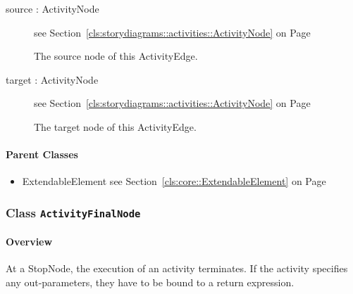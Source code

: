 \begin{description}
\begin{description}
	
\item[source : ActivityNode 	]
see Section~\ref{cls:storydiagrams::activities::ActivityNode} on Page~\pageref{cls:storydiagrams::activities::ActivityNode}
\hspace{\fill}
\nopagebreak


	
			
The source node of this ActivityEdge.	
		
	
\item[target : ActivityNode 	]
see Section~\ref{cls:storydiagrams::activities::ActivityNode} on Page~\pageref{cls:storydiagrams::activities::ActivityNode}
\hspace{\fill}
\nopagebreak


	
			
The target node of this ActivityEdge.	
		
	
	\end{description}
	

\end{description}

\paragraph{Parent Classes}
\begin{itemize}
\item ExtendableElement see Section~\ref{cls:core::ExtendableElement} on Page~\pageref{cls:core::ExtendableElement}\end{itemize}
\subsubsection{\Large{Class \bfseries \texttt{ActivityFinalNode}\normalfont}}
\label{cls:storydiagrams::activities::ActivityFinalNode} 
\paragraph{Overview}

	
			
At a StopNode, the execution of an activity terminates. If the activity specifies any out-parameters, they have to be bound to a return expression.	
		
	


